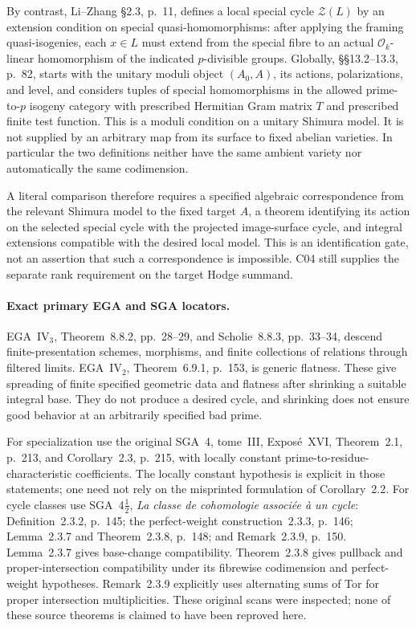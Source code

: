By contrast, Li--Zhang \S2.3, p.~11, defines a local special cycle
$\mathcal Z(L)$ by an extension condition on special
quasi-homomorphisms: after applying the framing quasi-isogenies,
each $x\in L$ must extend from the special fibre to an actual
$\mathcal O_k$-linear homomorphism of the indicated
$p$-divisible groups. Globally, \S\S13.2--13.3, p.~82, starts
with the unitary moduli object $(A_0,A)$, its actions,
polarizations, and level, and considers tuples of special
homomorphisms in the allowed prime-to-$p$ isogeny category with
prescribed Hermitian Gram matrix $T$ and prescribed finite test
function. This is a moduli condition on a unitary Shimura model.
It is not supplied by an arbitrary map from its surface to fixed
abelian varieties. In particular the two definitions neither have
the same ambient variety nor automatically the same codimension.

A literal comparison therefore requires a specified algebraic
correspondence from the relevant Shimura model to the fixed target
$A$, a theorem identifying its action on the selected special cycle
with the projected image-surface cycle, and integral extensions
compatible with the desired local model. This is an identification
gate, not an assertion that such a correspondence is impossible.
C04 still supplies the separate rank requirement on the target
Hodge summand.

\paragraph{Exact primary EGA and SGA locators.}
EGA~IV$_3$, Theorem~8.8.2, pp.~28--29, and Scholie~8.8.3,
pp.~33--34, descend finite-presentation schemes, morphisms, and
finite collections of relations through filtered limits.
EGA~IV$_2$, Theorem~6.9.1, p.~153, is generic flatness. These give
spreading of finite specified geometric data and flatness after
shrinking a suitable integral base. They do not produce a desired
cycle, and shrinking does not ensure good behavior at an arbitrarily
specified bad prime.

For specialization use the original SGA~4, tome~III,
Expos\'e~XVI, Theorem~2.1, p.~213, and Corollary~2.3, p.~215,
with locally constant prime-to-residue-characteristic coefficients.
The locally constant hypothesis is explicit in those statements;
one need not rely on the misprinted formulation of Corollary~2.2.
For cycle classes use SGA~4$\frac12$, \emph{La classe de cohomologie
associ\'ee \`a un cycle}: Definition~2.3.2, p.~145;
the perfect-weight construction~2.3.3, p.~146;
Lemma~2.3.7 and Theorem~2.3.8, p.~148; and
Remark~2.3.9, p.~150. Lemma~2.3.7 gives base-change compatibility.
Theorem~2.3.8 gives pullback and proper-intersection compatibility
under its fibrewise codimension and perfect-weight hypotheses.
Remark~2.3.9 explicitly uses alternating sums of Tor for proper
intersection multiplicities. These original scans were inspected;
none of these source theorems is claimed to have been reproved here.

